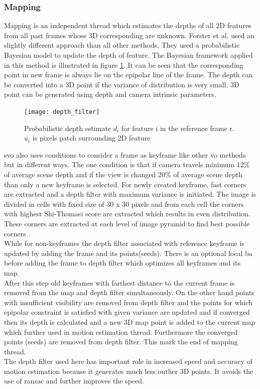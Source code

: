 \subsubsection{Mapping}
Mapping is an independent thread which estimates the depths of all 2D features from all past frames whose 3D corresponding are unknown. Forster et al. used an slightly different approach than all other methods. They used a probabilistic Bayesian model to update the depth of feature. The Bayesian framework applied in this method is illustrated in figure \ref{fig:depth_filter}. It can be seen that the corresponding point in new frame is always lie on the epipolar line of the frame. The depth can be converted into a 3D point if the variance of distribution is very small. 3D point can be generated using depth and camera intrinsic parameters. \\
\begin{figure}[H]
	\centering
	\texttt{[image: depth\_filter]}
	\caption{Probabilistic depth estimate $ d_{i} $ for feature i in the reference frame r. $u_{i} $ is pixels patch surrounding 2D feature \cite{Forster2014ICRA} }
	\label{fig:depth_filter}
\end{figure}
\noindent \acrshort{svo} also uses conditions to consider a frame as keyframe like other \acrshort{vo} methods but in different ways. The one condition is that if camera travels minimum 12\% of average scene depth and if the view is changed 20\% of average scene depth than only a new keyframe is selected. For newly created keyframe, \acrshort{fast} corners are extracted and a depth filter with maximum variance is initiated. The image is divided in cells with fixed size of 30 x 30 pixels and from each cell the corners with highest Shi-Thomasi score are extracted which results in even distribution. These corners are extracted at each level of image pyramid to find best possible corners \cite{Forster2014ICRA}. \\
\newline While for non-keyframes the depth filter associated with reference keyframe is updated by adding the frame and its points(seeds). There is an optional local \acrshort{ba} before adding the frame to depth filter which optimizes all keyframes and its map.\\
\newline After this step old keyframes with farthest distance to the current frame is removed from the map and depth filter simultaneously. On the other hand points with insufficient visibility are removed from depth filter and the points for which epipolar constraint is satisfied with given variance are updated and if converged then its depth is calculated and a new 3D map point is added to the current map which further used in motion estimation thread. Furthermore the converged points (seeds) are removed from depth filter. This mark the end of mapping thread.\\
\newline The depth filter used here has important role in increased speed and accuracy of motion estimation because it generates much less outlier 3D points. It avoids the use of \acrshort{ransac} and further improves the speed. 

